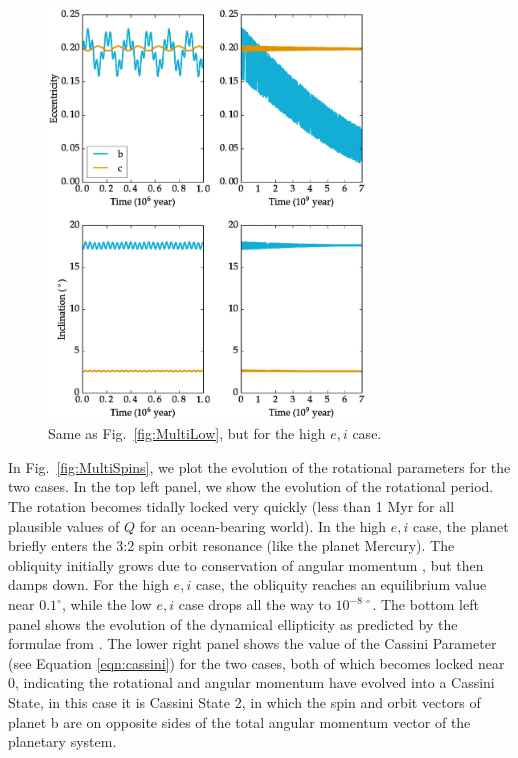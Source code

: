 \documentclass[preprint,12pt]{aastex}
\begin{document}
\begin{figure} 
\begin{center}
\includegraphics[width=0.75\textwidth]{MultiHigh2.eps}
\end{center}
\caption{Same as Fig.~\ref{fig:MultiLow}, but for the high $e,i$ case.}
\label{fig:MultiHigh}
\end{figure}

In Fig.~\ref{fig:MultiSpins}, we plot the evolution of the rotational
parameters for the two cases. In the top left panel, we show the
evolution of the rotational period. The rotation becomes tidally
locked very quickly (less than 1 Myr for all plausible values of $Q$
for an ocean-bearing world). 
In the high $e,i$ case, the planet briefly 
enters the 3:2 spin orbit resonance (like the planet Mercury).
The obliquity initially grows due to
conservation of angular momentum \citep{Correia08}, but then damps
down. For the high $e,i$ case, the obliquity reaches an equilibrium
value near $0.1^\circ$, while the low $e,i$ case drops all the way to
$10^{-8~\circ}$. The bottom left panel shows the evolution of the
dynamical ellipticity as predicted by the formulae from \cite{Atobe2007}.
The lower right panel shows the value of the Cassini Parameter 
(see Equation \ref{eqn:cassini}) for the two cases, both of
which becomes locked near 0, indicating the rotational and angular
momentum have evolved into a Cassini State, in this case it is Cassini
State 2, in which the spin and orbit vectors of planet b are on opposite 
sides of the total angular momentum vector of the planetary system. 
\end{document}
